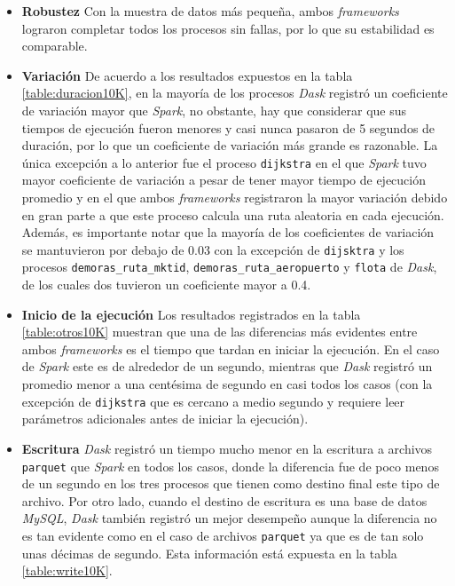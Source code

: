 \begin{itemize}
	
	\item \textbf{Robustez} Con la muestra de datos más pequeña, ambos \textit{frameworks} lograron completar todos los procesos sin fallas, por lo que su estabilidad es comparable.
	
	\item \textbf{Variación} De acuerdo a los resultados expuestos en la tabla \ref{table:duracion10K}, en la mayoría de los procesos \textit{Dask} registró un coeficiente de variación mayor que \textit{Spark}, no obstante, hay que considerar que sus tiempos de ejecución fueron menores y casi nunca pasaron de 5 segundos de duración, por lo que un coeficiente de variación más grande es razonable. La única excepción a lo anterior fue el proceso \texttt{dijkstra} en el que \textit{Spark} tuvo mayor coeficiente de variación a pesar de tener mayor tiempo de ejecución promedio y en el que ambos \textit{frameworks} registraron la mayor variación debido en gran parte a que este proceso calcula una ruta aleatoria en cada ejecución. Además, es importante notar que la mayoría de los coeficientes de variación se mantuvieron por debajo de 0.03 con la excepción de \texttt{dijsktra} y los procesos \texttt{demoras\_ruta\_mktid}, \texttt{demoras\_ruta\_aeropuerto} y \texttt{flota} de \textit{Dask}, de los cuales dos tuvieron un coeficiente mayor a 0.4.
	
	\item \textbf{Inicio de la ejecución} Los resultados registrados en la tabla \ref{table:otros10K} muestran que una de las diferencias más evidentes entre ambos \textit{frameworks} es el tiempo que tardan en iniciar la ejecución. En el caso de \textit{Spark} este es de alrededor de un segundo, mientras que \textit{Dask} registró un promedio menor a una centésima de segundo en casi todos los casos (con la excepción de \texttt{dijkstra} que es cercano a medio segundo y requiere leer parámetros adicionales antes de iniciar la ejecución).
	
	\item \textbf{Escritura} \textit{Dask} registró un tiempo mucho menor en la escritura a archivos \texttt{parquet} que \textit{Spark} en todos los casos, donde la diferencia fue de poco menos de un segundo en los tres procesos que tienen como destino final este tipo de archivo. Por otro lado, cuando el destino de escritura es una base de datos \textit{MySQL}, \textit{Dask} también registró un mejor desempeño aunque la diferencia no es tan evidente como en el caso de archivos \texttt{parquet} ya que es de tan solo unas décimas de segundo. Esta información está expuesta en la tabla \ref{table:write10K}.
	

\end{itemize}
